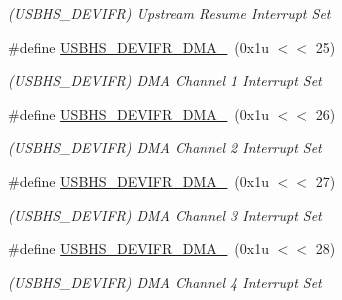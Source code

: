 \begin{DoxyCompactItemize}
\begin{DoxyCompactList}\small\item\em (U\+S\+B\+H\+S\+\_\+\+D\+E\+V\+I\+FR) Upstream Resume Interrupt Set \end{DoxyCompactList}\item 
\mbox{\label{group__SAMV71__USBHS_gab5569c75eca3a6b0948f66efeb6d4106}} 
\#define \mbox{\hyperlink{group__SAMV71__USBHS_gab5569c75eca3a6b0948f66efeb6d4106}{U\+S\+B\+H\+S\+\_\+\+D\+E\+V\+I\+F\+R\+\_\+\+D\+M\+A\+\_}}~(0x1u $<$$<$ 25)
\begin{DoxyCompactList}\small\item\em (U\+S\+B\+H\+S\+\_\+\+D\+E\+V\+I\+FR) D\+MA Channel 1 Interrupt Set \end{DoxyCompactList}\item 
\mbox{\label{group__SAMV71__USBHS_ga0f827b97dbe7dff7d554b7f37e6aa813}} 
\#define \mbox{\hyperlink{group__SAMV71__USBHS_ga0f827b97dbe7dff7d554b7f37e6aa813}{U\+S\+B\+H\+S\+\_\+\+D\+E\+V\+I\+F\+R\+\_\+\+D\+M\+A\+\_}}~(0x1u $<$$<$ 26)
\begin{DoxyCompactList}\small\item\em (U\+S\+B\+H\+S\+\_\+\+D\+E\+V\+I\+FR) D\+MA Channel 2 Interrupt Set \end{DoxyCompactList}\item 
\mbox{\label{group__SAMV71__USBHS_gaf66bef1e7538546cab2e2801601f3c08}} 
\#define \mbox{\hyperlink{group__SAMV71__USBHS_gaf66bef1e7538546cab2e2801601f3c08}{U\+S\+B\+H\+S\+\_\+\+D\+E\+V\+I\+F\+R\+\_\+\+D\+M\+A\+\_}}~(0x1u $<$$<$ 27)
\begin{DoxyCompactList}\small\item\em (U\+S\+B\+H\+S\+\_\+\+D\+E\+V\+I\+FR) D\+MA Channel 3 Interrupt Set \end{DoxyCompactList}\item 
\mbox{\label{group__SAMV71__USBHS_ga3c95cdd8ee93ef8dfc817fd28088e474}} 
\#define \mbox{\hyperlink{group__SAMV71__USBHS_ga3c95cdd8ee93ef8dfc817fd28088e474}{U\+S\+B\+H\+S\+\_\+\+D\+E\+V\+I\+F\+R\+\_\+\+D\+M\+A\+\_}}~(0x1u $<$$<$ 28)
\begin{DoxyCompactList}\small\item\em (U\+S\+B\+H\+S\+\_\+\+D\+E\+V\+I\+FR) D\+MA Channel 4 Interrupt Set \end{DoxyCompactList}\item 

\end{DoxyCompactItemize}
